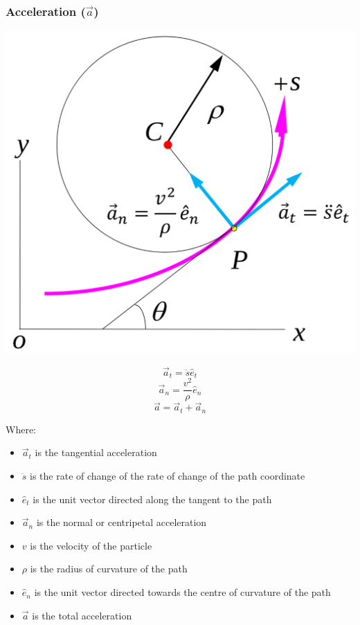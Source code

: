 \documentclass[11pt]{article}
\begin{document}
\subsubsection{Acceleration (\(\vec{a}\))}
\label{sec:org06f9b19}
\begin{center}
\includegraphics[scale=0.4]{./images/acceleration-in-path-coordinate-system.png}
\end{center}

\[\vec{a}_t = \ddot{s} \hat{e}_t\]
\[\vec{a}_n = \frac{v^2}{\rho} \hat{e}_n\]
\[\vec{a} = \vec{a}_t + \vec{a}_n\]

Where:
\begin{itemize}
\item \(\vec{a}_t\) is the tangential acceleration
\item \(\ddot{s}\) is the rate of change of the rate of change of the path coordinate
\item \(\hat{e}_t\) is the unit vector directed along the tangent to the path
\item \(\vec{a}_n\) is the normal or centripetal acceleration
\item \(v\) is the velocity of the particle
\item \(\rho\) is the radius of curvature of the path
\item \(\hat{e}_n\) is the unit vector directed towards the centre of curvature of the path
\item \(\vec{a}\) is the total acceleration
\end{itemize}
\end{document}
